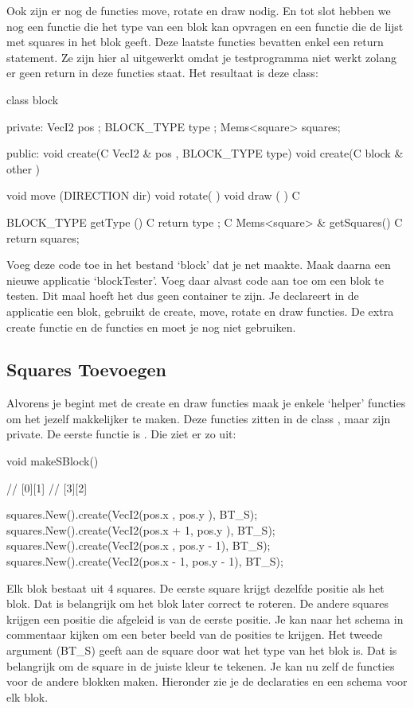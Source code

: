 Ook zijn er nog de functies move, rotate en draw nodig. En tot slot hebben we nog een functie die het type van een blok kan opvragen en een functie die de lijst met squares in het blok geeft. Deze laatste functies bevatten enkel een return statement. Ze zijn hier al uitgewerkt omdat je testprogramma niet werkt zolang er geen return in deze functies staat. Het resultaat is deze class:

\begin{code}
class block
{
private:
   VecI2        pos    ;
   BLOCK_TYPE   type   ;  
   Mems<square> squares;
   
public:
   void create(C VecI2 & pos  , BLOCK_TYPE type) { }
   void create(C block & other                 ) { }
	
   void move  (DIRECTION dir)   { }
   void rotate(             )   { }
   void draw  (             ) C { }
	
   BLOCK_TYPE       getType   () C { return type   ; }
	 C Mems<square> & getSquares() C { return squares; }
}
\end{code}

Voeg deze code toe in het bestand `block' dat je net maakte. Maak daarna een nieuwe applicatie `blockTester'. Voeg daar alvast code aan toe om een blok te testen. Dit maal hoeft het dus geen container te zijn. Je declareert in de applicatie een blok, gebruikt de create, move, rotate en draw functies. De extra create functie en de functies  en  moet je nog niet gebruiken.

\subsection{Squares Toevoegen}
Alvorens je begint met de create en draw functies maak je enkele `helper' functies om het jezelf makkelijker te maken. Deze functies zitten in de class , maar zijn private. De eerste functie is . Die ziet er zo uit:

\begin{code}
void makeSBlock()
{
	//    [0][1]
	// [3][2] 
	
	squares.New().create(VecI2(pos.x    , pos.y    ), BT_S);
	squares.New().create(VecI2(pos.x + 1, pos.y    ), BT_S);
	squares.New().create(VecI2(pos.x    , pos.y - 1), BT_S);
	squares.New().create(VecI2(pos.x - 1, pos.y - 1), BT_S);     
}
\end{code}

Elk blok bestaat uit 4 squares. De eerste square krijgt dezelfde positie als het blok. Dat is belangrijk om het blok later correct te roteren. De andere squares krijgen een positie die afgeleid is van de eerste positie. Je kan naar het schema in commentaar kijken om een beter beeld van de posities te krijgen. Het tweede argument (BT\_S) geeft aan de square door wat het type van het blok is. Dat is belangrijk om de square in de juiste kleur te tekenen. Je kan nu zelf de functies voor de andere blokken maken. Hieronder zie je de declaraties en een schema voor elk blok.

